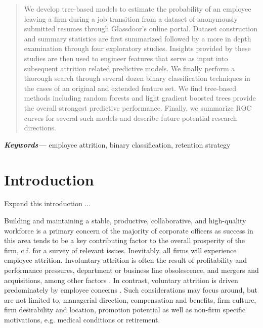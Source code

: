 \documentclass[10pt]{article}
\providecommand{\keywords}[1]{\textbf{\textit{Keywords---}} #1}
\begin{document}
\begin{abstract}
We develop tree-based models to estimate the probability of an employee leaving a 
firm during a job transition from a dataset of anonymously submitted resumes 
through Glassdoor's online portal.  Dataset  construction and summary 
statistics are first summarized followed by a more in depth examination  
through four exploratory studies.  Insights provided by these studies are then 
used to engineer features that serve as input into subsequent attrition related 
predictive models.  We finally perform a thorough search through several dozen binary 
classification techniques in the cases of an original and extended feature set.  
We find tree-based methods including random forests and light gradient boosted trees 
provide the overall strongest predictive performance.  Finally, we summarize ROC curves 
for several such models and describe future potential research directions. 
\end{abstract}

\keywords{employee attrition, binary classification, retention strategy}

\section{Introduction}

{\color{blue} Expand this introduction ...}

\hspace{\parindent}
Building and maintaining a stable, productive, collaborative, and high-quality workforce is a primary concern 
of the majority of corporate officers as success in this area tends to be a key contributing factor to the 
overall prosperity of the firm, c.f. \cite{Mir1993} for a survey of relevant issues.
Inevitably, all firms will experience employee attrition.  
Involuntary attrition is often the result of profitability and performance pressures, department or business 
line obsolescence, and mergers and acquisitions, among other factors \cite{Datta2009,Grip2006,SHAU1998}.  In contrast,
voluntary attrition is driven predominately by employee concerns \cite{Singh2012}.  Such considerations 
may focus around, but are not limited to, managerial direction, compensation and benefits, firm culture, 
firm desirability and location, promotion potential as well as non-firm specific motivations, e.g. medical 
conditions or retirement. 
  
\end{document}
